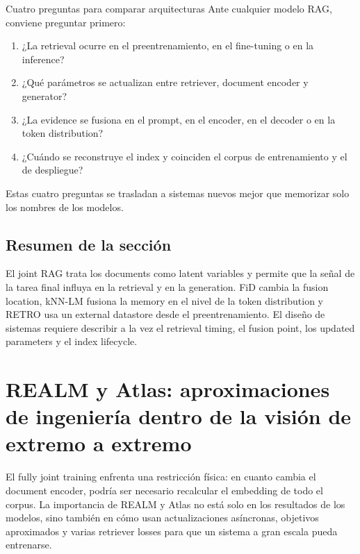 \documentclass[a4paper]{article}
\begin{document}
\begin{importantbox}{Cuatro preguntas para comparar arquitecturas}
Ante cualquier modelo RAG, conviene preguntar primero:
\begin{enumerate}
  \item ¿La retrieval ocurre en el preentrenamiento, en el fine-tuning o en la inference?
  \item ¿Qué parámetros se actualizan entre retriever, document encoder y generator?
  \item ¿La evidence se fusiona en el prompt, en el encoder, en el decoder o en la token distribution?
  \item ¿Cuándo se reconstruye el index y coinciden el corpus de entrenamiento y el de despliegue?
\end{enumerate}
Estas cuatro preguntas se trasladan a sistemas nuevos mejor que memorizar solo los nombres de los modelos.
\end{importantbox}


\subsection{Resumen de la sección}

El joint RAG trata los documents como latent variables y permite que la señal de la tarea final influya en la retrieval y en la generation. FiD cambia la fusion location, kNN-LM fusiona la memory en el nivel de la token distribution y RETRO usa un external datastore desde el preentrenamiento. El diseño de sistemas requiere describir a la vez el retrieval timing, el fusion point, los updated parameters y el index lifecycle.
\section{REALM y Atlas: aproximaciones de ingeniería dentro de la visión de extremo a extremo}

El fully joint training enfrenta una restricción física: en cuanto cambia el document encoder, podría ser necesario recalcular el embedding de todo el corpus. La importancia de REALM y Atlas no está solo en los resultados de los modelos, sino también en cómo usan actualizaciones asíncronas, objetivos aproximados y varias retriever losses para que un sistema a gran escala pueda entrenarse.
\end{document}
